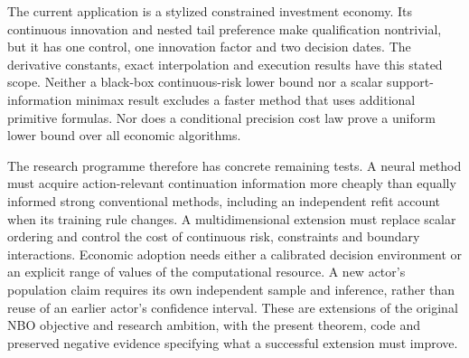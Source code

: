 The current application is a stylized constrained investment economy.
Its continuous innovation and nested tail preference make qualification
nontrivial, but it has one control, one innovation factor and two decision
dates. The derivative constants, exact interpolation and execution results
have this stated scope. Neither a black-box continuous-risk lower bound
nor a scalar support-information minimax result excludes a faster method
that uses additional primitive formulas. Nor does a conditional precision
cost law prove a uniform lower bound over all economic algorithms.

The research programme therefore has concrete remaining tests. A neural
method must acquire action-relevant continuation information more cheaply
than equally informed strong conventional methods, including an independent
refit account when its training rule changes. A multidimensional extension
must replace scalar ordering and control the cost of continuous risk,
constraints and boundary interactions. Economic adoption needs either a
calibrated decision environment or an explicit range of values of the
computational resource. A new actor's population claim requires its own
independent sample and inference, rather than reuse of an earlier actor's
confidence interval. These are extensions of the original NBO objective
and research ambition, with the present theorem, code and preserved
negative evidence specifying what a successful extension must improve.
